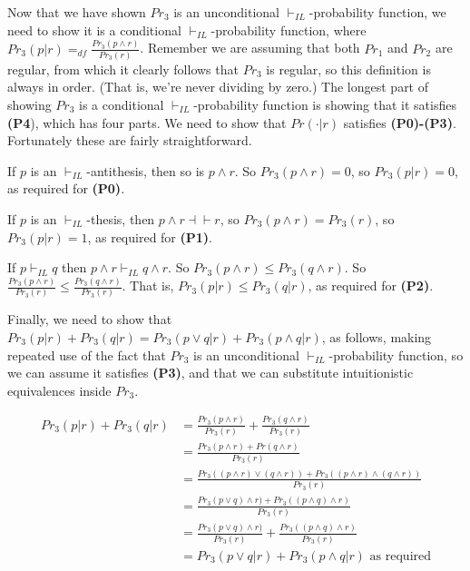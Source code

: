 \documentclass[
  11pt,
  letterpaper,
  DIV=11,
  numbers=noendperiod,
  oneside]{scrartcl}
\begin{document}
Now that we have shown \(Pr_3\) is an unconditional
\(\vdash_{IL}\)-probability function, we need to show it is a
conditional \(\vdash_{IL}\)-probability function, where
\(Pr_3(p | r) =_{df} \frac{Pr_3(p \wedge r)}{Pr_3(r)}\). Remember we are
assuming that both \(Pr_1\) and \(Pr_2\) are regular, from which it
clearly follows that \(Pr_3\) is regular, so this definition is always
in order. (That is, we're never dividing by zero.) The longest part of
showing \(Pr_3\) is a conditional \(\vdash_{IL}\)-probability function
is showing that it satisfies \textbf{(P4}), which has four parts. We
need to show that \(Pr(\cdot | r)\) satisfies \textbf{(P0)-(P3)}.
Fortunately these are fairly straightforward.

If \(p\) is an \(\vdash_{IL}\)-antithesis, then so is \(p \wedge r\). So
\(Pr_3(p \wedge r) = 0\), so \(Pr_3(p | r) = 0\), as required for
\textbf{(P0)}.

If \(p\) is an \(\vdash_{IL}\)-thesis, then
\(p \wedge r \dashv \vdash r\), so \(Pr_3(p \wedge r) = Pr_3(r)\), so
\(Pr_3(p | r) = 1\), as required for \textbf{(P1)}.

If \(p \vdash_{IL} q\) then \(p \wedge r \vdash_{IL} q \wedge r\). So
\(Pr_3(p \wedge r) \leq Pr_3(q \wedge r)\). So
\(\frac{Pr_3(p \wedge r)}{Pr_3(r)} \leq \frac{Pr_3(q \wedge r)}{Pr_3(r)}\).
That is, \(Pr_3(p | r) \leq Pr_3(q | r)\), as required for
\textbf{(P2)}.

Finally, we need to show that
\(Pr_3(p | r) + Pr_3(q | r) = Pr_3(p \vee q | r) + Pr_3(p \wedge q | r)\),
as follows, making repeated use of the fact that \(Pr_3\) is an
unconditional \(\vdash_{IL}\)-probability function, so we can assume it
satisfies \textbf{(P3)}, and that we can substitute intuitionistic
equivalences inside \(Pr_3\).

\[
\begin{aligned}
Pr_3(p | r) + Pr_3(q | r) &= \frac{Pr_3(p \wedge r)}{Pr_3(r)} + \frac{Pr_3(q \wedge r)}{Pr_3(r)} \\
&= \frac{Pr_3(p \wedge r) + Pr(q \wedge r)}{Pr_3(r)} \\
&= \frac{Pr_3((p \wedge r) \vee (q \wedge r)) + Pr_3((p \wedge r) \wedge (q \wedge r))}{Pr_3(r)} \\
&=\frac{Pr_3(p \vee q) \wedge r) + Pr_3((p \wedge q) \wedge r)}{Pr_3(r)} \\
&=\frac{Pr_3(p \vee q) \wedge r)}{Pr_3(r)} + \frac{Pr_3((p \wedge q) \wedge r)}{Pr_3(r)} \\
&=Pr_3(p \vee q | r) + Pr_3(p \wedge q | r) \text{ as required}
\end{aligned}
\]
\end{document}
